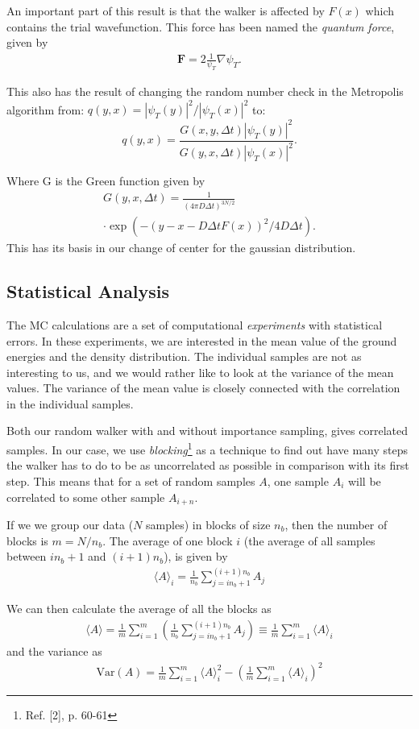 \documentclass[twocolumns, a4paper,10pt,fleqn]{extarticle}
\newcommand{\eq}[1]{{\small\begin{align*}#1\end{align*}}}
\renewcommand\vec[1]{\boldsymbol{\mathbf{#1}}}
\newcommand{\Var}[1]{\mathrm{Var}(#1)}
\begin{document}
An important part of this result is that the walker is affected by $F(x)$
which contains the trial wavefunction. This force has been named 
the \textit{quantum force}, given by
\begin{align*}
\vec F = 2\frac{1}{\psi_T}\nabla \psi_T. 
\end{align*}

This also has the result of changing the random number check in the 
Metropolis algorithm from:
$q(y,x) = |\psi_T(y)|^2/|\psi_T(x)|^2$ to: 
\[
q(y,x) = \frac{G(x,y,\Delta t)|\psi_T(y)|^2}{G(y,x,\Delta t)|\psi_T(x)|^2}.
\]

Where G is the Green function given by
\eq{
  G(y,x,\Delta t) =  \frac{1}{(4\pi D\Delta t)^{3N/2}}\\ \cdot \exp{\left(-(y-x-D\Delta t F(x))^2/4D\Delta t\right)}.
}
This has its basis in our change of center for the gaussian distribution.

\subsection{Statistical Analysis}
The MC calculations are a set of computational \textit{experiments} 
with statistical errors. In these experiments, we are interested in the mean
value of the ground energies and the density distribution. The 
individual samples are not as interesting to us, and we would rather like
to look at the variance of the mean values. 
The variance of the mean value is closely connected with the correlation
in the individual samples. 


Both our random walker with and without importance sampling, gives correlated
samples. In our case, we use \textit{blocking}\footnote{Ref. [2], p. 60-61}
as a technique to find out have many steps
the walker has to do to be as uncorrelated as possible in comparison with its first step.
This means that for a set of random samples $A$, one sample $A_i$ will be correlated
to some other sample $A_{i+n}$.

If we we group our data ($N$ samples) in blocks of size $n_b$,
then the number of blocks is $m = N/n_b$.
The average of one block $i$ (the average of all samples
between $i n_b + 1$ and $(i+1)n_b$), is given by 
\eq{
\langle A \rangle_i = \frac{1}{n_b}\sum_{j=in_b+1}^{(i+1)n_b} A_j
}

We can then calculate the average of all the blocks as
\eq{
  \langle A \rangle = 
  \frac{1}{m}\sum_{i=1}^m \left(
    \frac{1}{n_b}\sum_{j=in_b+1}^{(i+1)n_b} A_j \right)
  \equiv \frac{1}{m}\sum_{i=1}^m \langle A \rangle_i
}
and the variance as
\eq{
  \Var{A}=
  \frac{1}{m}\sum_{i=1}^m \langle A \rangle_i^2
  -\left(\frac{1}{m}\sum_{i=1}^m \langle A \rangle_i\right)^2
}
\end{document}
